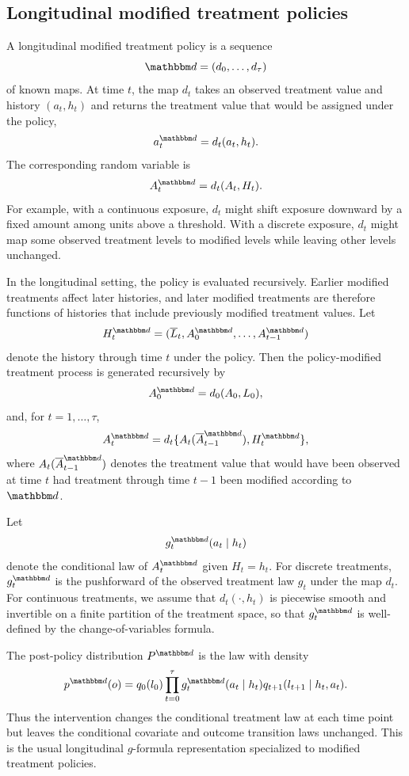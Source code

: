 \documentclass[11pt]{article}
\begin{document}
\subsection{Longitudinal modified treatment policies}
\label{subsec:lmtps}

A longitudinal modified treatment policy is a sequence
\[
  \mathbbm d = (d_0,\ldots,d_\tau)
\]
of known maps. At time \(t\), the map \(d_t\) takes an observed treatment value
and history \((a_t,h_t)\) and returns the treatment value that would be assigned
under the policy,
\[
  a_t^{\mathbbm d} = d_t(a_t,h_t).
\]
The corresponding random variable is
\[
  A_t^{\mathbbm d} = d_t(A_t,H_t).
\]
For example, with a continuous exposure, \(d_t\) might shift exposure downward by
a fixed amount among units above a threshold. With a discrete exposure, \(d_t\)
might map some observed treatment levels to modified levels while leaving other
levels unchanged.

In the longitudinal setting, the policy is evaluated recursively. Earlier
modified treatments affect later histories, and later modified treatments are
therefore functions of histories that include previously modified treatment
values. Let
\[
  H_t^{\mathbbm d}
  =
  (\overline L_t, A_0^{\mathbbm d},\ldots,A_{t-1}^{\mathbbm d})
\]
denote the history through time \(t\) under the policy. Then the policy-modified
treatment process is generated recursively by
\[
  A_0^{\mathbbm d}
  =
  d_0(A_0,L_0),
\]
and, for \(t=1,\ldots,\tau\),
\[
  A_t^{\mathbbm d}
  =
  d_t\{A_t(\overline A_{t-1}^{\mathbbm d}),H_t^{\mathbbm d}\},
\]
where \(A_t(\overline A_{t-1}^{\mathbbm d})\) denotes the treatment value that
would have been observed at time \(t\) had treatment through time \(t-1\) been
modified according to \(\mathbbm d\).

Let
\[
  g_t^{\mathbbm d}(a_t\mid h_t)
\]
denote the conditional law of \(A_t^{\mathbbm d}\) given \(H_t=h_t\). For
discrete treatments, \(g_t^{\mathbbm d}\) is the pushforward of the observed
treatment law \(g_t\) under the map \(d_t\). For continuous treatments, we assume
that \(d_t(\cdot,h_t)\) is piecewise smooth and invertible on a finite partition
of the treatment space, so that \(g_t^{\mathbbm d}\) is well-defined by the
change-of-variables formula.

The post-policy distribution \(P^{\mathbbm d}\) is the law with density
\[
  p^{\mathbbm d}(o)
  =
  q_0(l_0)
  \prod_{t=0}^{\tau}
  g_t^{\mathbbm d}(a_t\mid h_t)
  q_{t+1}(l_{t+1}\mid h_t,a_t).
\]
Thus the intervention changes the conditional treatment law at each time point
but leaves the conditional covariate and outcome transition laws unchanged. This
is the usual longitudinal \(g\)-formula representation specialized to modified
treatment policies.
\end{document}

